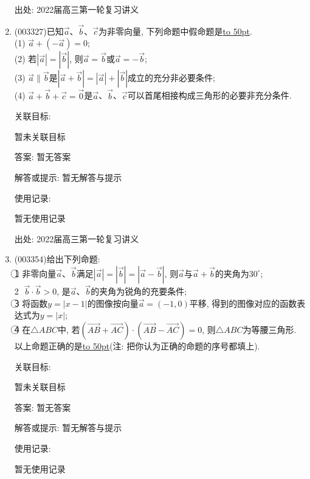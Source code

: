 \documentclass[10pt,a4paper]{article}
\newcommand{\blank}[1]{\underline{\hbox to #1pt{}}}
\begin{document}
\begin{enumerate}[1.]
出处: 2022届高三第一轮复习讲义
\item { (003327)}已知$\overrightarrow a$、$\overrightarrow b$、$\overrightarrow c$为非零向量, 下列命题中假命题是\blank{50}.\\
(1) $\overrightarrow a+(-\overrightarrow a)=0$;\\
(2) 若$| \overrightarrow a|=|\overrightarrow b|$, 则$\overrightarrow a=\overrightarrow b$或$\overrightarrow a=-\overrightarrow b$;\\
(3) $\overrightarrow a\parallel \overrightarrow b$是$| \overrightarrow a+\overrightarrow b|=|\overrightarrow a|+|\overrightarrow b|$成立的充分非必要条件;\\
(4) $\overrightarrow a+\overrightarrow b+\overrightarrow c=\overrightarrow 0$是$\overrightarrow a$、$\overrightarrow b$、$\overrightarrow c$可以首尾相接构成三角形的必要非充分条件.


关联目标:

暂未关联目标

答案: 暂无答案

解答或提示: 暂无解答与提示

使用记录:

暂无使用记录


出处: 2022届高三第一轮复习讲义
\item { (003354)}给出下列命题:\\
\textcircled{1} 非零向量$\overrightarrow a$、$\overrightarrow b$满足$|\overrightarrow a|=|\overrightarrow b|=|\overrightarrow a-\overrightarrow b|$, 则$\overrightarrow a$与$\overrightarrow a+\overrightarrow b$的夹角为$30^\circ$;\\
\textcircled{2} $\overrightarrow b\cdot \overrightarrow b>0$, 是$\overrightarrow a$、$\overrightarrow b$的夹角为锐角的充要条件;\\
\textcircled{3}  将函数$y=|x-1|$的图像按向量$\overrightarrow a=(-1,0)$平移, 得到的图像对应的函数表达式为$y=|x|$;\\
\textcircled{4} 在$\triangle ABC$中, 若$(\overrightarrow{AB}+\overrightarrow{AC})\cdot (\overrightarrow{AB}-\overrightarrow{AC})=0$, 则$\triangle ABC$为等腰三角形.\\
以上命题正确的是\blank{50}(注: 把你认为正确的命题的序号都填上).


关联目标:

暂未关联目标

答案: 暂无答案

解答或提示: 暂无解答与提示

使用记录:

暂无使用记录



\end{enumerate}
\end{document}
